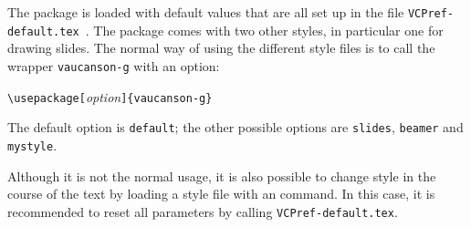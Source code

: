 \documentclass[11pt,twoside]{article}
\newlength{\ColoText}%
\newlength{\ColoFigu}%
\newlength{\parindenttemp} %
\newcommand{\noi}{\noindent}
\newlength{\jsIndent}%
\begin{document}
The package \VCSG is loaded with default values that are all set up 
in the file \verb+VCPref-default.tex+~. 
%
%
%
%
The package comes with two other styles, in particular one for 
drawing slides. 
The normal way of using the different style files is to call the 
wrapper \texttt{vaucanson-g} with an option:

\noi 
\hspace*{-\jsIndent}
\begin{minipage}[c]{\ColoText}
        \par\vspace*{0mm}%
        \footnotesize
\verb+\usepackage[+\textsl{option}\verb+]{vaucanson-g}+
\end{minipage}%
\hspace*{1.2em}%
\begin{minipage}[c]{\ColoFigu}%
\par\vspace*{0mm}%
The default option is \texttt{default}; the other possible options are
\texttt{slides}, \texttt{beamer} and \texttt{mystyle}.
\end{minipage}%

Although it is not the normal usage,
it is also possible to change style in the course of the text by 
loading a style file with an \verb++ command. In this
case, it is recommended to reset all parameters by calling
\verb+VCPref-default.tex+.
\end{document}
